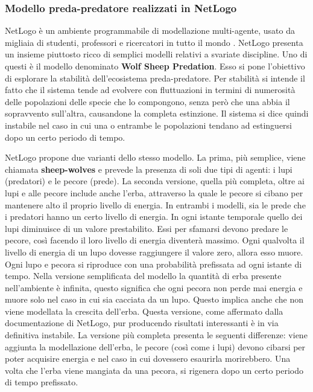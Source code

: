 \documentclass[11pt]{article}
\begin{document}
\subsubsection{Modello preda-predatore realizzati in NetLogo}
NetLogo è un ambiente programmabile di modellazione multi-agente, usato da migliaia di studenti, professori e ricercatori in tutto il mondo \cite{Netlogo}. NetLogo presenta un insieme piuttosto ricco di semplici modelli relativi a svariate discipline. Uno di questi è il modello denominato \textbf{Wolf Sheep Predation}. Esso si pone l'obiettivo di esplorare la stabilità dell'ecosistema preda-predatore. Per stabilità si intende il fatto che il sistema tende ad evolvere con fluttuazioni in termini di numerosità delle popolazioni delle specie che lo compongono, senza però che una abbia il sopravvento sull'altra, causandone la completa estinzione. Il sistema si dice quindi instabile nel caso in cui una o entrambe le popolazioni tendano ad estinguersi dopo un certo periodo di tempo.

NetLogo propone due varianti dello stesso modello. La prima, più semplice, viene chiamata \textbf{sheep-wolves} e prevede la presenza di soli due tipi di agenti: i lupi (predatori) e le pecore (prede). La seconda versione, quella più completa, oltre ai lupi e alle pecore include anche l'erba, attraverso la quale le pecore si cibano per mantenere alto il proprio livello di energia. In entrambi i modelli, sia le prede che i predatori hanno un certo livello di energia. In ogni istante temporale quello dei lupi diminuisce di un valore prestabilito. Essi per sfamarsi devono predare le pecore, così facendo il loro livello di energia diventerà massimo. Ogni qualvolta il livello di energia di un lupo dovesse raggiungere il valore zero, allora esso muore. Ogni lupo e pecora si riproduce con una probabilità prefissata ad ogni istante di tempo. Nella versione semplificata del modello la quantità di erba presente nell'ambiente è infinita, questo significa che ogni pecora non perde mai energia e muore solo nel caso in cui sia cacciata da un lupo. Questo implica anche che non viene modellata la crescita dell'erba. Questa versione, come affermato dalla documentazione di NetLogo, pur producendo risultati interessanti è in via definitiva instabile. La versione più completa presenta le seguenti differenze: viene aggiunta la modellazione dell'erba, le pecore (così come i lupi) devono cibarsi per poter acquisire energia e nel caso in cui dovessero esaurirla morirebbero. Una volta che l'erba viene mangiata da una pecora, si rigenera dopo un certo periodo di tempo prefissato. 
\end{document}
